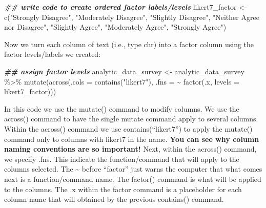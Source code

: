 \documentclass[
]{krantz}
\makeatletter
\newenvironment{Shaded}{\begin{snugshade}}{\end{snugshade}}
\newcommand{\AttributeTok}[1]{\textcolor[rgb]{0.61,0.61,0.61}{#1}}
\newcommand{\DocumentationTok}[1]{\textcolor[rgb]{0.37,0.37,0.37}{\textbf{\textit{#1}}}}
\newcommand{\FunctionTok}[1]{\textcolor[rgb]{0,0,0}{#1}}
\newcommand{\NormalTok}[1]{#1}
\newcommand{\OtherTok}[1]{\textcolor[rgb]{0.37,0.37,0.37}{#1}}
\newcommand{\SpecialCharTok}[1]{\textcolor[rgb]{0,0,0}{#1}}
\newcommand{\StringTok}[1]{\textcolor[rgb]{0.5,0.5,0.5}{#1}}
\newenvironment{kframe}{%
\medskip{}
\setlength{\fboxsep}{.8em}
 \def\at@end@of@kframe{}%
 \ifinner\ifhmode%
  \def\at@end@of@kframe{\end{minipage}}%
  \begin{minipage}{\columnwidth}%
 \fi\fi%
 \def\FrameCommand##1{\hskip\@totalleftmargin \hskip-\fboxsep
 \colorbox{shadecolor}{##1}\hskip-\fboxsep
     \hskip-\linewidth \hskip-\@totalleftmargin \hskip\columnwidth}%
 \MakeFramed {\advance\hsize-\width
   \@totalleftmargin\z@ \linewidth\hsize
   \@setminipage}}%
 {\par\unskip\endMakeFramed%
 \at@end@of@kframe}
\renewenvironment{Shaded}{\begin{kframe}}{\end{kframe}}
\makeatother
\begin{document}
\begin{Shaded}
\begin{Highlighting}[]
\DocumentationTok{\#\# write code to create ordered factor labels/levels}
\NormalTok{likert7\_factor }\OtherTok{\textless{}{-}} \FunctionTok{c}\NormalTok{(}\StringTok{"Strongly Disagree"}\NormalTok{,}
                    \StringTok{"Moderately Disagree"}\NormalTok{,}
                    \StringTok{"Slightly Disagree"}\NormalTok{,}
                    \StringTok{"Neither Agree nor Disagree"}\NormalTok{,}
                    \StringTok{"Slightly Agree"}\NormalTok{,}
                    \StringTok{"Moderately Agree"}\NormalTok{,}
                    \StringTok{"Strongly Agree"}\NormalTok{)}
\end{Highlighting}
\end{Shaded}

Now we turn each column of text (i.e., type chr) into a factor column using the factor levels/labels we created:

\begin{Shaded}
\begin{Highlighting}[]
\DocumentationTok{\#\# assign factor levels}
\NormalTok{analytic\_data\_survey }\OtherTok{\textless{}{-}}\NormalTok{ analytic\_data\_survey }\SpecialCharTok{\%\textgreater{}\%}
  \FunctionTok{mutate}\NormalTok{(}\FunctionTok{across}\NormalTok{(}\AttributeTok{.cols =} \FunctionTok{contains}\NormalTok{(}\StringTok{"likert7"}\NormalTok{), }
                \AttributeTok{.fns =} \SpecialCharTok{\textasciitilde{}} \FunctionTok{factor}\NormalTok{(.x, }\AttributeTok{levels =}\NormalTok{ likert7\_factor)))}
\end{Highlighting}
\end{Shaded}

In this code we use the mutate() command to modify columns. We use the across() command to have the single mutate command apply to several columns. Within the across() command we use contains(``likert7'') to apply the mutate() command only to columns with likert7 in the name. \textbf{You can see why column naming conventions are so important!} Next, within the across() command, we specify .fns. This indicate the function/command that will apply to the columns selected. The \textasciitilde{} before ``factor'' just warns the computer that what comes next is a function/command name. The factor() command is what will be applied to the columns. The .x within the factor command is a placeholder for each column name that will obtained by the previous contains() command.
\end{document}
